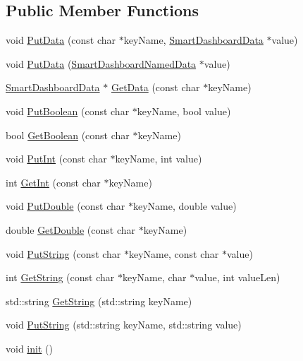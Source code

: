 \subsection*{Public Member Functions}
\begin{DoxyCompactItemize}
\item 
void \hyperlink{classSmartDashboard_a3e7cb12569b31c239ed5d5a68f29c2b0}{PutData} (const char $\ast$keyName, \hyperlink{classSmartDashboardData}{SmartDashboardData} $\ast$value)
\item 
void \hyperlink{classSmartDashboard_a9a6f92d68911111789ab8c1f1c96973f}{PutData} (\hyperlink{classSmartDashboardNamedData}{SmartDashboardNamedData} $\ast$value)
\item 
\hyperlink{classSmartDashboardData}{SmartDashboardData} $\ast$ \hyperlink{classSmartDashboard_a9324d4ce00b92d2181e61dcb01b7a8cb}{GetData} (const char $\ast$keyName)
\item 
void \hyperlink{classSmartDashboard_afece0d9b59b122580b6167d1c7faa29b}{PutBoolean} (const char $\ast$keyName, bool value)
\item 
bool \hyperlink{classSmartDashboard_affd05014cc8281e01e049c53a329b38d}{GetBoolean} (const char $\ast$keyName)
\item 
void \hyperlink{classSmartDashboard_afc4fcbf4522a461be5254a1fe4b8ff7d}{PutInt} (const char $\ast$keyName, int value)
\item 
int \hyperlink{classSmartDashboard_a232c20ebcdd000d1c74db943f20eac0b}{GetInt} (const char $\ast$keyName)
\item 
void \hyperlink{classSmartDashboard_ad52d7edbc2dee91e9d7d10f381620a39}{PutDouble} (const char $\ast$keyName, double value)
\item 
double \hyperlink{classSmartDashboard_ae9b0b4c077bfd6dc72f2494688a44ed5}{GetDouble} (const char $\ast$keyName)
\item 
void \hyperlink{classSmartDashboard_af30da1e01120617de30cfa1f62e8e9a2}{PutString} (const char $\ast$keyName, const char $\ast$value)
\item 
int \hyperlink{classSmartDashboard_ac6b875f74b563388ada75261e8f84a46}{GetString} (const char $\ast$keyName, char $\ast$value, int valueLen)
\item 
std::string \hyperlink{classSmartDashboard_ab8b1a0f045d3d92263c21774f79e8d85}{GetString} (std::string keyName)
\item 
void \hyperlink{classSmartDashboard_a5a445bba77b5c398020e5c29c3b24d21}{PutString} (std::string keyName, std::string value)
\item 
void \hyperlink{classSmartDashboard_ae8ea8b62acfb5174bc70185b0e5021de}{init} ()
\end{DoxyCompactItemize}
